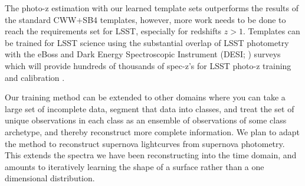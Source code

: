 The photo-z estimation with our learned template sets outperforms the results of the standard CWW+SB4 templates, however, more work needs to be done to reach the requirements set for LSST, especially for redshifts $z>1$.
Templates can be trained for LSST science using the substantial overlap of LSST photometry with the eBoss \citep{Dawson2016} and Dark Energy Spectroscopic Instrument (DESI; \citealt{DESICollaboration2016}) surveys which will provide hundreds of thousands of spec-z's for LSST photo-z training and calibration \citep{Schmidt2014,Newman2015}.

Our training method can be extended to other domains where you can take a large set of incomplete data, segment that data into classes, and treat the set of unique observations in each class as an ensemble of observations of some class archetype, and thereby reconstruct more complete information.
We plan to adapt the method to reconstruct supernova lightcurves from supernova photometry.
This extends the spectra we have been reconstructing into the time domain, and amounts to iteratively learning the shape of a surface rather than a one dimensional distribution.